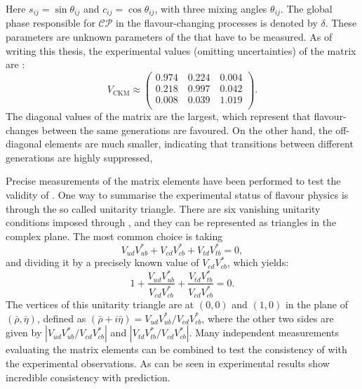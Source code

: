 Here $s_{ij}=\sin\theta_{ij}$ and $c_{ij}=\cos\theta_{ij}$, with three mixing angles $\theta_{ij}$.
The global phase responsible for $\mathcal{CP}$ in the flavour-changing processes is denoted by $\delta$.
These parameters are unknown parameters of the \SM that have to be measured.
As of writing this thesis, the experimental values (omitting uncertainties) of the \CKM matrix are \cite{Workman:2022ynf}:
\begin{equation}
    V_{\mathrm{CKM}} \approx 
    \begin{pmatrix}
        0.974 \quad 0.224 \quad 0.004\\
        0.218 \quad 0.997 \quad 0.042\\
        0.008 \quad 0.039 \quad 1.019\\
    \end{pmatrix}.
\end{equation}
The diagonal values of the \CKM matrix are the largest, which represent that flavour-changes between the same generations are favoured.
On the other hand, the off-diagonal elements are much smaller, indicating that transitions between different generations are highly suppressed,

Precise measurements of the \CKM matrix elements have been performed to test the validity of \SM.
One way to summarise the experimental status of flavour physics is through the so called unitarity triangle.
There are six vanishing unitarity conditions imposed through , and they can be represented as triangles in the complex plane.
The most common choice is taking
\begin{equation}
    V_{ud}V_{ub}^* + V_{cd}V^*_{cb} + V_{td}V_{tb}^* =0,
\end{equation}
and dividing it by a precisely known value of $V_{cd}V^*_{cb}$, which yields:
\begin{equation}
    1+\frac{V^{}_{ud}V_{ub}^*}{V^{}_{cd}V_{cb}^*}+\frac{V^{}_{td}V_{tb}^*}{V^{}_{cd}V_{cb}^*} = 0.
\end{equation}
The vertices of this unitarity triangle are at $(0,0)$ and $(1,0)$ in the plane of $(\bar{\rho},\bar{\eta})$, defined as $(\bar{\rho}+i\bar{\eta})=V^{}_{ud}V_{ub}^*/V^{}_{cd}V_{cb}^*$,
where the other two sides are given by $|V^{}_{ud}V_{ub}^*/V^{}_{cd}V_{cb}^*|$ and $|V^{}_{td}V_{tb}^*/V^{}_{cd}V_{cb}^*|$.
Many independent measurements evaluating the \CKM matrix elements can be combined to test the consistency of \SM with the experimental observations.
As can be seen in  experimental results show incredible consistency with \SM prediction.

